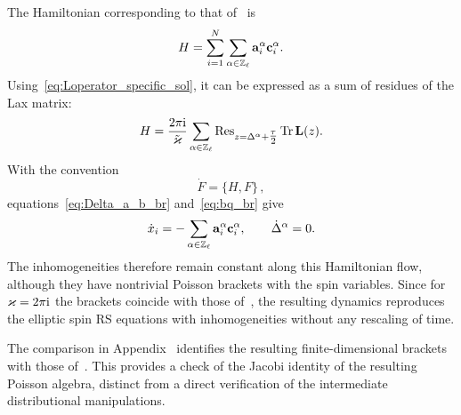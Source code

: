 The Hamiltonian corresponding to that of~\cite{arutyunov_elliptic_2026} is
\begin{equation}
H=\sum_{i=1}^{N}\sum_{\alpha \in \mathbb{Z}_\ell}
\mathbf a_i^\alpha\mathbf c_i^\alpha.
\end{equation}
Using~\eqref{eq:Loperator_specific_sol}, it can be expressed as a sum of residues of the Lax matrix:
\begin{equation}
H=
\frac{2\pi \mathrm{i} }{\tilde{\varkappa}}
\sum_{\alpha \in \mathbb{Z}_\ell}
\operatorname{Res}_{z=\Delta^\alpha+\tfrac{\tau}{2}}
\operatorname{Tr}\mathbf{L}(z).
\end{equation}
With the convention 
\begin{equation}
\dot{F}=\{H,F \} \,,
\end{equation}
equations~\eqref{eq:Delta_a_b_br} and~\eqref{eq:bq_br} give
\begin{equation}
\dot{x}_i=- \sum_{\alpha \in \mathbb{Z}_\ell}
\mathbf{a}_i^\alpha\mathbf{c}_i^\alpha,
\qquad
\dot\Delta^\alpha=0.
\end{equation}
The inhomogeneities therefore remain constant along this Hamiltonian flow, although they have nontrivial Poisson brackets with the spin variables. Since for $\varkappa=2\pi\mathrm{i}$ the brackets coincide with those of~\cite{arutyunov_elliptic_2026}, the resulting dynamics reproduces the elliptic spin RS equations with inhomogeneities without any rescaling of time.

The comparison in Appendix~ identifies the
resulting finite-dimensional brackets with those of~\cite{arutyunov_elliptic_2026}. This provides a check of the Jacobi identity of the 
resulting Poisson algebra, distinct from a direct verification of the intermediate
distributional manipulations.